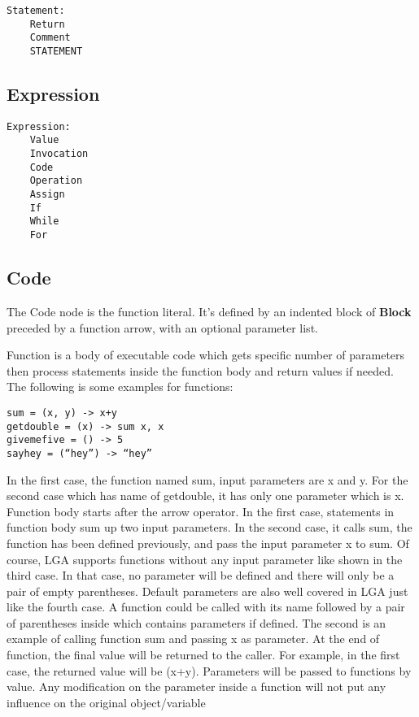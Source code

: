 \documentclass[10pt]{report}
\begin{document}
\begin{verbatim}
Statement:
    Return
    Comment
    STATEMENT
\end{verbatim}

\subsection{Expression}

\begin{verbatim}
Expression:
    Value
    Invocation
    Code
    Operation
    Assign
    If
    While
    For
\end{verbatim}

\subsection{Code}

The Code node is the function literal. It's defined by an indented block of \textbf{Block} preceded by a function arrow, with an optional parameter list.

Function is a body of executable code which gets specific number of parameters then process statements inside the function body and return values if needed.  The following is some examples for functions:
\begin{verbatim}
sum = (x, y) -> x+y
getdouble = (x) -> sum x, x
givemefive = () -> 5
sayhey = (“hey”) -> “hey”
\end{verbatim}

In the first case, the function named sum, input parameters are x and y. For the second case which has name of getdouble, it has only one parameter which is x. Function body starts after the arrow operator. In the first case, statements in function body sum up two input parameters. In the second case, it calls sum, the function has been defined previously, and pass the input parameter x to sum. Of course, LGA supports functions without any input parameter like shown in the third case. In that case, no parameter will be defined and there will only be a pair of empty parentheses. Default parameters are also well covered in LGA just like the fourth case. 
A function could be called with its name followed by a pair of parentheses inside which contains parameters if defined. The second is an example of calling function sum and passing x as parameter.
At the end of function, the final value will be returned to the caller. For example, in the first case, the returned value will be (x+y). 
Parameters will be passed to functions by value. Any modification on the parameter inside a function will not put any influence on the original object/variable
\end{document}
